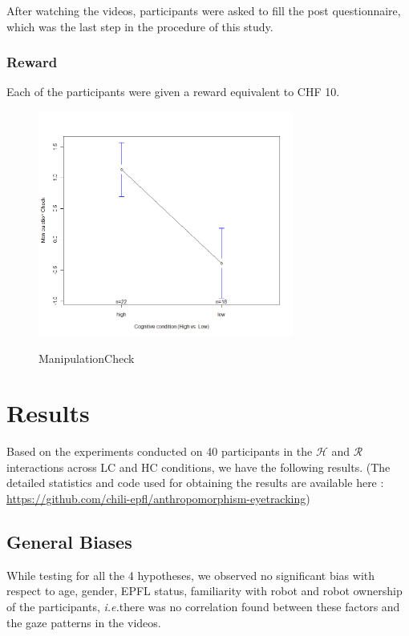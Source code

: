 \documentclass[a4,twocolumn,10pt]{article}
\newcommand{\ie}{{\textit{i.e.\xspace}}}
\begin{document}
After watching the videos, participants were asked to fill the post
questionnaire, which was the last step in the procedure of this study.

\subsubsection{Reward}

Each of the participants were given a reward equivalent to CHF 10.

\begin{figure}
    {\includegraphics[width=3.3in]{ManipulationCheck}}
    \caption{ManipulationCheck}
    \label{fig:ManipulationCheck}
\end{figure}

\section{Results}

Based on the experiments conducted on 40 participants in the $\mathcal{H}$ and
$\mathcal{R}$ interactions across LC and HC conditions, we have the following
results. (The detailed statistics and code used for obtaining the results are
available here : \url{https://github.com/chili-epfl/anthropomorphism-eyetracking})

\subsection{General Biases}

While testing for all the 4 hypotheses, we observed no significant bias with
respect to age, gender, EPFL status, familiarity with robot and robot ownership
of the participants, \ie there was no correlation found between these factors
and the gaze patterns in the videos.
\end{document}
